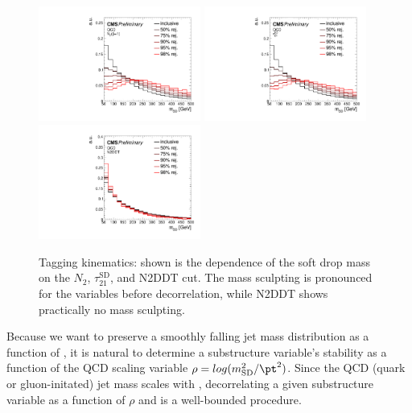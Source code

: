 \begin{figure}
  \centering
  \includegraphics[width=0.475\textwidth]{figures/higgstagging/QCDN2_mSD.pdf}
  \includegraphics[width=0.475\textwidth]{figures/higgstagging/QCDtau21SD_mSD.pdf}\\
  \includegraphics[width=0.475\textwidth]{figures/higgstagging/QCDN2DDT_mSD.pdf}\\
  \caption{Tagging kinematics: shown is the dependence of the soft drop mass on the $N_2$, $\tau_{21}^\text{SD}$, and N2DDT cut. The mass sculpting is pronounced for the variables before decorrelation, while N2DDT shows practically no mass sculpting.}
  \label{fig:taggingkinematics}
\end{figure}


Because we want to preserve a smoothly falling jet mass distribution as a function of \pt, it is natural to determine a substructure variable's stability as a function of the QCD scaling variable $\rho=log(m_{\text{SD}}^2/\pt^2)$.
Since the QCD (quark or gluon-initated) jet mass scales with \pt, decorrelating a given substructure variable as a function of $\rho$ and \pt is a well-bounded procedure.

